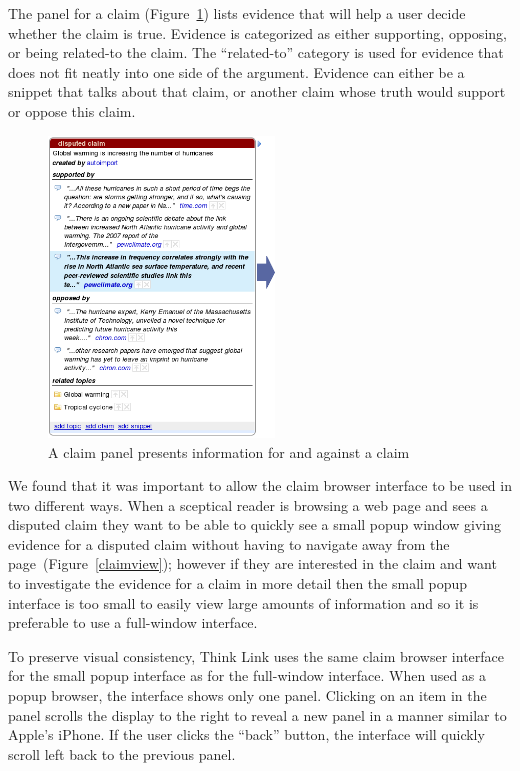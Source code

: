 \documentclass{chi2009}
\begin{document}
The panel for a claim (Figure~\ref{panel}) lists evidence that will help a user decide whether the claim is true. Evidence is categorized as either supporting, opposing, or being related-to the claim. The ``related-to'' category is used for evidence that does not fit neatly into one side of the argument. Evidence can either be a snippet that talks about that claim, or another claim whose truth would support or oppose this claim. 

\begin{figure}[tb]
	\begin{center}
	\includegraphics[width=6cm]{../screenshots/v2_panel.png}
	\caption{A claim panel presents information for and against a claim}
	\label{panel}
	\end{center}
\end{figure}

We found that it was important to allow the claim browser interface to be used in two different ways. When a sceptical reader is browsing a web page and sees a disputed claim they want to be able to quickly see a small popup window giving evidence for a disputed claim without having to navigate away from the page~(Figure~\ref{claimview}); however if they are interested in the claim and want to investigate the evidence for a claim in more detail then the small popup interface is too small to easily view large amounts of information and so it is preferable to use a full-window interface. 

To preserve visual consistency, Think Link uses the same claim browser interface for the small popup interface as for the full-window interface. When used as a popup browser, the interface shows only one panel. Clicking on an item in the panel scrolls the display to the right to reveal a new panel in a manner similar to Apple's iPhone. If the user clicks the ``back'' button, the interface will quickly scroll left back to the previous panel.
\end{document}
